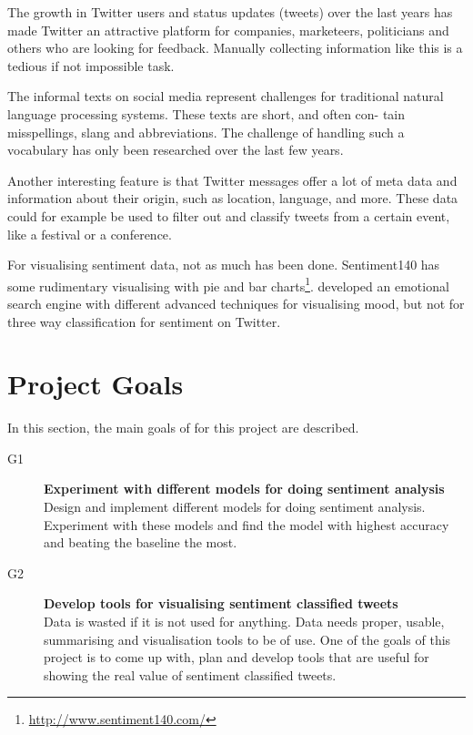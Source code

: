 The growth in Twitter users and status updates (tweets) over the last years has made Twitter an attractive platform for companies, marketeers, politicians and others who are looking for feedback. Manually collecting information like this is a tedious if not impossible task.

The informal texts on social media represent challenges for traditional natural language processing systems. These texts are short, and often con- tain misspellings, slang and abbreviations. The challenge of handling such a vocabulary has only been researched over the last few years.

Another interesting feature is that Twitter messages offer a lot of meta data and information about their origin, such as location, language, and more. These data could for example be used to filter out and classify tweets from a certain event, like a festival or a conference.

For visualising sentiment data, not as much has been done. Sentiment140 has some rudimentary visualising with pie and bar charts\footnote{\url{http://www.sentiment140.com/}}. \cite{article:wefeelfine} developed an emotional search engine with different advanced techniques for visualising mood, but not for three way classification for sentiment on Twitter.

\section{Project Goals}
\label{sec:projectgoals}

In this section, the main goals of for this project are described.

\begin{description}

\item[G1] \textbf{Experiment with different models for doing sentiment analysis} \\
	Design and implement different models for doing sentiment analysis. Experiment with these models and find the model with highest accuracy and beating the baseline the most. 
	
\item[G2] \textbf{Develop tools for visualising sentiment classified tweets} \\
    Data is wasted if it is not used for anything. Data needs proper, usable, summarising and visualisation tools to be of use. One of the goals of this project is to come up with, plan and develop tools that are useful for showing the real value of sentiment classified tweets. 

\end{description}

